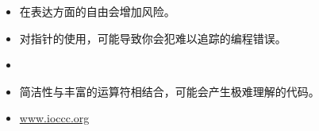 \begin{frame}
  \begin{free}[C的缺点]{}
  \begin{itemize}
  \item  在表达方面的自由会增加风险。\\[0.2in]
  \item  对指针的使用，可能导致你会犯难以追踪的编程错误。
  \item[] \\[0.2in]
  \item 简洁性与丰富的运算符相结合，可能会产生极难理解的代码。
  \item[]  
    \url{www.ioccc.org}
  \end{itemize}
  \end{free}
\end{frame}
